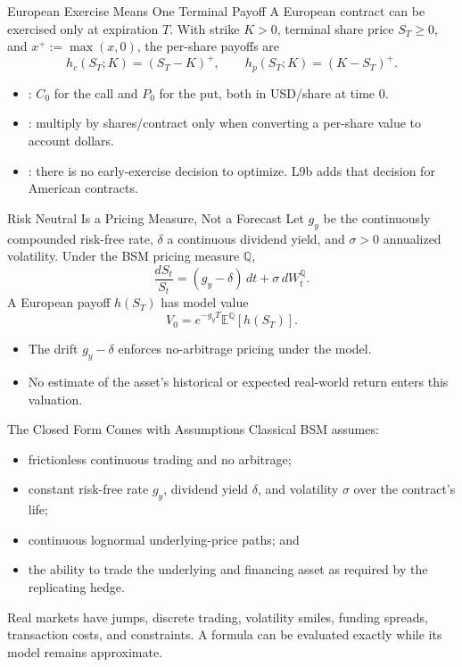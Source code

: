 \documentclass[aspectratio=169,11pt]{beamer}
\newcommand{\E}{\mathbb{E}}
\newcommand{\Q}{\mathbb{Q}}
\newcommand{\gy}{g_y}
\newcommand{\ST}{S_T}
\begin{document}
\begin{frame}{European Exercise Means One Terminal Payoff}
  A European contract can be exercised only at expiration $T$. With strike
  $K>0$, terminal share price $\ST\geq0$, and $x^+:=\max(x,0)$, the per-share
  payoffs are
  \[
    \boxed{h_c(\ST;K)=(\ST-K)^+,
    \qquad h_p(\ST;K)=(K-\ST)^+.}
  \]
  \begin{itemize}\setlength{\itemsep}{0.35em}
    \item {}: $C_0$ for the call and $P_0$ for the put, both in
      USD/share at time $0$.
    \item {}: multiply by shares/contract only when converting
      a per-share value to account dollars.
    \item {}: there is no early-exercise decision to optimize. L9b
      adds that decision for American contracts.
  \end{itemize}
\end{frame}

\begin{frame}{Risk Neutral Is a Pricing Measure, Not a Forecast}
  Let $\gy$ be the continuously compounded risk-free rate, $\delta$ a continuous
  dividend yield, and $\sigma>0$ annualized volatility. Under the BSM pricing
  measure $\Q$,
  \[
    \frac{dS_t}{S_t}=(\gy-\delta)\,dt+\sigma\,dW_t^{\Q}.
  \]
  A European payoff $h(\ST)$ has model value
  \[
    \boxed{V_0=e^{-\gy T}\E^{\Q}[h(\ST)].}
  \]
  \begin{itemize}\setlength{\itemsep}{0.3em}
    \item The drift $\gy-\delta$ enforces no-arbitrage pricing under the model.
    \item No estimate of the asset's historical or expected real-world return
      enters this valuation.
  \end{itemize}
\end{frame}

\begin{frame}{The Closed Form Comes with Assumptions}
  Classical BSM assumes:
  \begin{itemize}\setlength{\itemsep}{0.45em}
    \item frictionless continuous trading and no arbitrage;
    \item constant risk-free rate $\gy$, dividend yield $\delta$, and volatility
      $\sigma$ over the contract's life;
    \item continuous lognormal underlying-price paths; and
    \item the ability to trade the underlying and financing asset as required by
      the replicating hedge.
  \end{itemize}
  \vspace{0.4em}
  Real markets have jumps, discrete trading, volatility smiles, funding spreads,
  transaction costs, and constraints. A formula can be evaluated exactly while
  its model remains approximate.
\end{frame}
\end{document}
